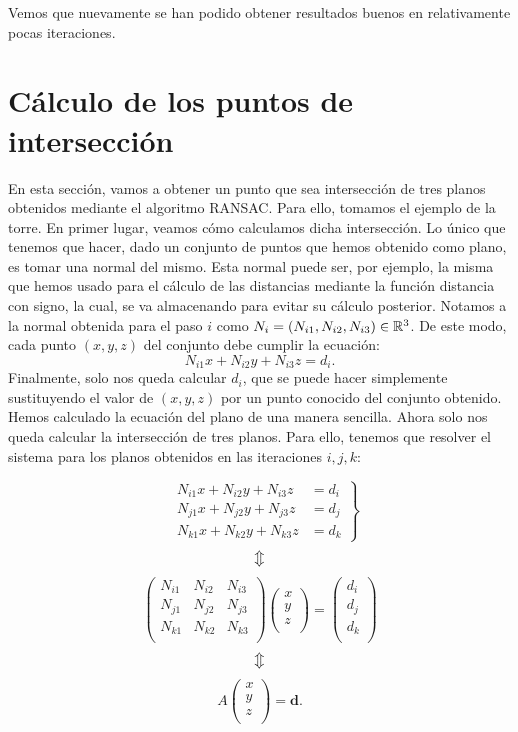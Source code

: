 Vemos que nuevamente se han podido obtener resultados buenos en relativamente pocas iteraciones.

\section{Cálculo de los puntos de intersección}
En esta sección, vamos a obtener un punto que sea intersección de tres planos obtenidos mediante el algoritmo RANSAC. Para ello, tomamos el ejemplo de la torre. En primer lugar, veamos cómo calculamos dicha intersección. Lo único que tenemos que hacer, dado un conjunto de puntos que hemos obtenido como plano, es tomar una normal del mismo. Esta normal puede ser, por ejemplo, la misma que hemos usado para el cálculo de las distancias mediante la función distancia con signo, la cual, se va almacenando para evitar su cálculo posterior. Notamos a la normal obtenida para el paso $ i $ como $ N_i = (N_{i1}, N_{i2}, N_{i3}) \in \mathbb{R}^3$. De este modo, cada punto $ (x,y,z) $ del conjunto debe cumplir la ecuación:
\[
N_{i1} x + N_{i2} y + N_{i3} z = d_i.
\]
Finalmente, solo nos queda calcular $ d _i$, que se puede hacer simplemente sustituyendo el valor de $ (x,y,z) $ por un punto conocido del conjunto obtenido. Hemos calculado la ecuación del plano de una manera sencilla. Ahora solo nos queda calcular la intersección de tres planos. Para ello, tenemos que resolver el sistema para los planos obtenidos en las iteraciones $ i,j,k $:

\[
\left.
\begin{array}{rcl}
&N_{i1}x + N_{i2}y + N_{i3}z  &= d_i \\ 
&N_{j1}x + N_{j2}y + N_{j3}z  &= d_j \\
&N_{k1}x + N_{k2}y + N_{k3}z  &= d_k
\end{array}
\right\}
\]
\[
\big\Updownarrow
\]
\[
\begin{pmatrix}
N_{i1} & N_{i2} & N_{i3}\\
N_{j1} & N_{j2} & N_{j3}\\
N_{k1} & N_{k2} & N_{k3}\\
\end{pmatrix}
\begin{pmatrix}
x\\
y\\
z\\
\end{pmatrix}
=
\begin{pmatrix}
d_i\\
d_j\\
d_k\\
\end{pmatrix}
\]
\[
\big\Updownarrow
\]
\[
A \begin{pmatrix}
x\\
y\\
z\\
\end{pmatrix}
=
\mathit{\mathbf{d}}.
\]

